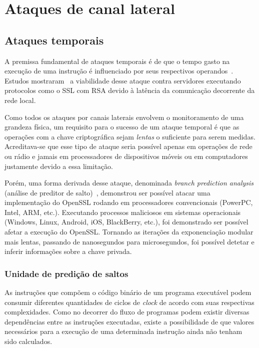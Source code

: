 \documentclass{SBCbookchapter}
\begin{document}

\section{Ataques de canal lateral}

%
\subsection{Ataques temporais}

A premissa fundamental de ataques temporais \'{e} de que o tempo gasto na execu\c{c}\~{a}o de uma instru\c{c}\~{a}o \'{e} influenciado por seus respectivos operandos~\cite{ECCBook_HankersonVanstone2004}. Estudos mostraram~\cite{1251354} a viabilidade desse ataque contra servidores executando protocolos como o SSL com RSA devido à lat\^{e}ncia da comunica\c{c}\~{a}o decorrente da rede local.

Como todos os ataques por canais laterais envolvem o monitoramento de uma grandeza f\'{i}sica, um requisito para o sucesso de um ataque temporal \'{e} que as opera\c{c}\~{o}es com a chave criptogr\'{a}fica sejam \textit{lentas} o suficiente para serem medidas. Acreditava-se que esse tipo de ataque seria poss\'{i}vel apenas em opera\c{c}\~{o}es de rede ou r\'{a}dio e jamais em processadores de dispositivos m\'{o}veis ou  em computadores justamente devido a essa limita\c{c}\~{a}o.

Por\'{e}m, uma forma derivada desse ataque, denominada \textit{branch prediction analysis} (an\'{a}lise de preditor de salto)~\cite{1266999}, demonstrou ser poss\'{i}vel atacar uma implementa\c{c}\~{a}o do OpenSSL rodando em processadores convencionais (PowerPC, Intel, ARM, etc.). Executando processos maliciosos em sistemas operacionais (Windows, Linux, Android, iOS, BlackBerry, etc.), foi demonstrado ser poss\'{i}vel afetar a execu\c{c}\~{a}o do OpenSSL. Tornando as itera\c{c}\~{o}es da exponencia\c{c}\~{a}o modular mais lentas, passando de nanosegundos para microsegundos, foi possível detetar e inferir informações sobre a chave privada.

\subsubsection{Unidade de predi\c{c}\~{a}o de saltos}

As instru\c{c}\~{o}es que comp\~{o}em o c\'{o}digo bin\'{a}rio de um programa execut\'{a}vel podem consumir diferentes quantidades de ciclos de \textit{clock} de acordo com suas respectivas complexidades. Como no decorrer do fluxo de programas podem existir diversas depend\^{e}ncias entre as instru\c{c}\~{o}es executadas, existe a possibilidade de que valores necess\'{a}rios para a execu\c{c}\~{a}o de uma determinada instru\c{c}\~{a}o ainda n\~{a}o tenham sido calculados.
\end{document}
